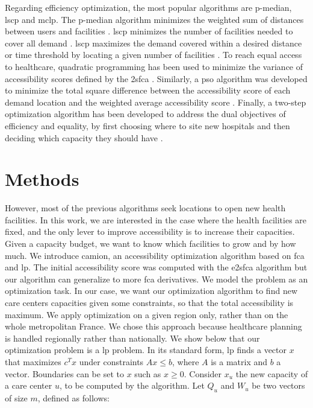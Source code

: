 Regarding efficiency optimization, the most popular algorithms are p-median, \ac{lscp} and \ac{mclp}. The p-median algorithm minimizes the weighted sum of distances between users and facilities \cite{murad_using_2021}. \ac{lscp} minimizes the number of facilities needed to cover all demand \cite{shavandi_fuzzy_2006}. \ac{lscp} maximizes the demand covered within a desired distance or time threshold by locating a given number of facilities \cite{casado_heuristical_2005}.
To reach equal access to healthcare, quadratic programming has been used to  minimize the variance of accessibility scores defined by the \ac{2sfca} \cite{wang_planning_2013}. Similarly, a \ac{pso} algorithm was developed to minimize the total square difference between the accessibility score of each demand location and the weighted average accessibility score \cite{tao_spatial_2014}. Finally, a two-step optimization algorithm has been developed to address the dual objectives of efficiency and equality, by first choosing where to site new hospitals and then deciding which capacity they should have \cite{luo_two-step_2017,li_two-step_2017}.

\section{Methods}

However, most of the previous algorithms seek locations to open new health facilities. In this work, we are interested in the case where the health facilities are fixed, and the only lever to improve accessibility is to increase their capacities. Given a capacity budget, we want to know which facilities to grow and by how much. We introduce \ac{camion}, an accessibility optimization algorithm based on \ac{fca} and \ac{lp}. The initial accessibility score was computed with the \ac{e2sfca} algorithm \cite{luo_enhanced_2009} but our algorithm can generalize to more \ac{fca} derivatives.
We model the problem as an optimization task. In our case, we want our optimization algorithm to find new care centers capacities given some constraints, so that the total accessibility is maximum. We apply optimization on a given region only, rather than on the whole metropolitan France. We chose this approach because healthcare planning is handled regionally rather than nationally. We show below that our optimization problem is a \ac{lp} problem.
In its standard form, \ac{lp} finds a vector $x$ that maximizes $c^T x$ under constraints $Ax \leq b$, where $A$ is a matrix and $b$ a vector. Boundaries can be set to $x$ such as $x \geq 0$. Consider $x_u$ the new capacity of a care center $u$, to be computed by the algorithm. Let $Q_u$ and $W_u$ be two vectors of size $m$, defined as follows:

